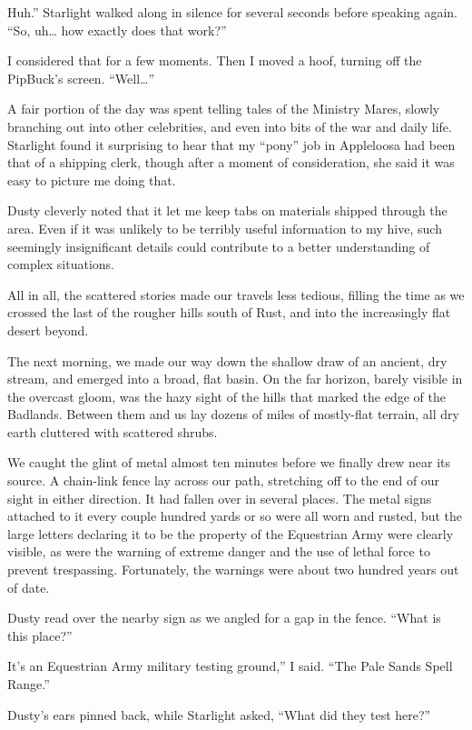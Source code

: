 \leavevmode{}Huh.” Starlight walked along in silence for several seconds before speaking again. “So, uh… how exactly does that work?”

I considered that for a few moments. Then I moved a hoof, turning off the PipBuck’s screen. “Well…”

{\br}%
A fair portion of the day was spent telling tales of the Ministry Mares, slowly branching out into other celebrities, and even into bits of the war and daily life. Starlight found it surprising to hear that my “pony” job in Appleloosa had been that of a shipping clerk, though after a moment of consideration, she said it was easy to picture me doing that.

Dusty cleverly noted that it let me keep tabs on materials shipped through the area. Even if it was unlikely to be terribly useful information to my hive, such seemingly insignificant details could contribute to a better understanding of complex situations.

All in all, the scattered stories made our travels less tedious, filling the time as we crossed the last of the rougher hills south of Rust, and into the increasingly flat desert beyond.

The next morning, we made our way down the shallow draw of an ancient, dry stream, and emerged into a broad, flat basin. On the far horizon, barely visible in the overcast gloom, was the hazy sight of the hills that marked the edge of the Badlands. Between them and us lay dozens of miles of mostly-flat terrain, all dry earth cluttered with scattered shrubs.

We caught the glint of metal almost ten minutes before we finally drew near its source. A chain-link fence lay across our path, stretching off to the end of our sight in either direction. It had fallen over in several places. The metal signs attached to it every couple hundred yards or so were all worn and rusted, but the large letters declaring it to be the property of the Equestrian Army were clearly visible, as were the warning of extreme danger and the use of lethal force to prevent trespassing. Fortunately, the warnings were about two hundred years out of date.

Dusty read over the nearby sign as we angled for a gap in the fence. “What is this place?”

\leavevmode{}It’s an Equestrian Army military testing ground,” I said. “The Pale Sands Spell Range.”

Dusty’s ears pinned back, while Starlight asked, “What did they test here?”

